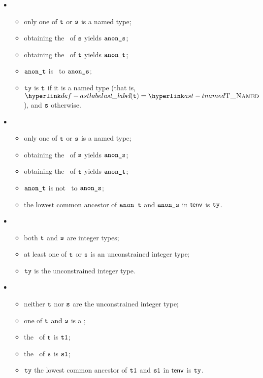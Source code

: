 \begin{itemize}
\begin{itemize}
\begin{itemize}
      \item {}
      \begin{itemize}
        \item only one of $\texttt{t}$ or $\texttt{s}$ is a named type;
        \item obtaining the \underlyingtype\ of $\texttt{s}$ yields $\texttt{anon\_s}$\ProseOrTypeError;
        \item obtaining the \underlyingtype\ of $\texttt{t}$ yields $\texttt{anon\_t}$\ProseOrTypeError;
        \item $\texttt{anon\_t}$ is \typeequal\ to $\texttt{anon\_s}$;
        \item $\texttt{ty}$ is $\texttt{t}$ if it is a named type (that is, $\astlabel(\vt)=\TNamed$), and $\texttt{s}$ otherwise.
      \end{itemize}

      \item {}
      \begin{itemize}
        \item only one of $\texttt{t}$ or $\texttt{s}$ is a named type;
        \item obtaining the \underlyingtype\ of $\texttt{s}$ yields $\texttt{anon\_s}$\ProseOrTypeError;
        \item obtaining the \underlyingtype\ of $\texttt{t}$ yields $\texttt{anon\_t}$\ProseOrTypeError;
        \item $\texttt{anon\_t}$ is not \typeequal\ to $\texttt{anon\_s}$;
        \item the lowest common ancestor of $\texttt{anon\_t}$ and $\texttt{anon\_s}$ in $\textsf{tenv}$ is $\texttt{ty}$\ProseOrTypeError.
      \end{itemize}

      \item {}
      \begin{itemize}
        \item both $\texttt{t}$ and $\texttt{s}$ are integer types;
        \item at least one of $\texttt{t}$ or $\texttt{s}$ is an unconstrained integer type;
        \item $\texttt{ty}$ is the unconstrained integer type.
      \end{itemize}

      \item {}
      \begin{itemize}
        \item neither $\texttt{t}$ nor $\texttt{s}$ are the unconstrained integer type;
        \item one of $\texttt{t}$ and $\texttt{s}$ is a \parameterizedintegertype;
        \item the \wellconstrainedversion\ of $\texttt{t}$ is $\texttt{t1}$;
        \item the \wellconstrainedversion\ of $\texttt{s}$ is $\texttt{s1}$;
        \item $\texttt{ty}$ the lowest common ancestor of $\texttt{t1}$ and $\texttt{s1}$ in $\textsf{tenv}$ is $\texttt{ty}$\ProseOrTypeError.
      \end{itemize}


\end{itemize}
\end{itemize}
\end{itemize}
